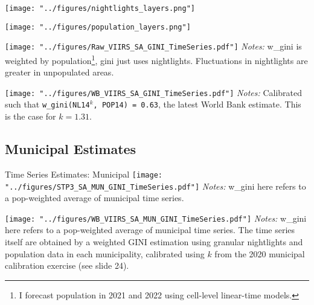 \documentclass[compress,xcolor=dvipsnames]{beamer}
\newcommand{\code}[1]{\texttt{#1}}
\newenvironment{noheadline}{
    \setbeamertemplate{headline}{}
    \addtobeamertemplate{frametitle}{\vspace*{-0.9\baselineskip}}{}
}{}
\begin{document}
\begin{frame}
\centering
\texttt{[image: "../figures/nightlights\_layers.png"]}
\end{frame}


\begin{frame}
\centering
\texttt{[image: "../figures/population\_layers.png"]}
\end{frame}


\begin{frame}
\centering
\texttt{[image: "../figures/Raw\_VIIRS\_SA\_GINI\_TimeSeries.pdf"]}
\textit{Notes:} w\_gini is weighted by population\footnote{I forecast population in 2021 and 2022 using cell-level linear-time models.}, gini just uses nightlights. Fluctuations in nightlights are greater in unpopulated areas. 
\end{frame}

\begin{frame}
\centering
\texttt{[image: "../figures/WB\_VIIRS\_SA\_GINI\_TimeSeries.pdf"]}
\textit{Notes:} Calibrated such that \code{w\_gini(NL14$^k$, POP14) = 0.63}, the latest World Bank estimate. This is the case for $k = 1.31$.
\end{frame}

\subsection{Municipal Estimates}


\begin{noheadline}
\begin{frame}{Time Series Estimates: Municipal}
\texttt{[image: "../figures/STP3\_SA\_MUN\_GINI\_TimeSeries.pdf"]}
\footnotesize
\textit{Notes:} w\_gini here refers to a pop-weighted average of municipal time series.
\end{frame}
\end{noheadline}

\begin{frame}
\texttt{[image: "../figures/WB\_VIIRS\_SA\_MUN\_GINI\_TimeSeries.pdf"]}
\footnotesize
\textit{Notes:} w\_gini here refers to a pop-weighted average of municipal time series. The time series itself are obtained by a weighted GINI estimation using granular nightlights and population data in each municipality, calibrated using $k$ from the 2020 municipal calibration exercise (see slide 24).
\end{frame}
\end{document}
